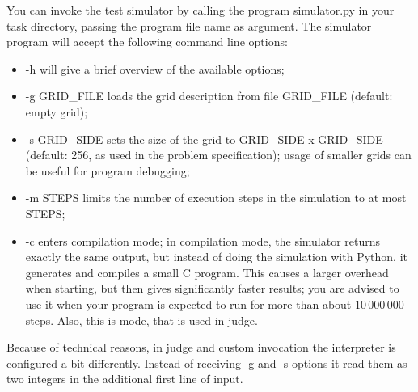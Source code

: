You can invoke the test simulator by calling the program simulator.py in your task directory, passing the program file name as argument. The simulator program will accept the following command line options:
\begin{itemize}
\item -h will give a brief overview of the available options;
\item -g GRID_FILE loads the grid description from file GRID_FILE (default: empty grid);
\item -s GRID_SIDE sets the size of the grid to GRID_SIDE x GRID_SIDE (default: 256,
as used in the problem specification); usage of smaller grids can be useful for program
debugging;
\item -m STEPS limits the number of execution steps in the simulation to at most STEPS;
\item -c enters compilation mode; in compilation mode, the simulator returns exactly the same output, but instead of doing the simulation with Python, it generates and compiles a small C program. This causes a larger overhead when starting, but then gives significantly faster results; you are advised to use it when your program is expected to run for more than about $10\,000\,000$ steps. Also, this is mode, that is used in judge. 
\end{itemize}


Because of technical reasons, in judge and custom invocation the interpreter is configured a bit differently. Instead of receiving -g and -s options it read them as two integers in the additional first line of input. 
